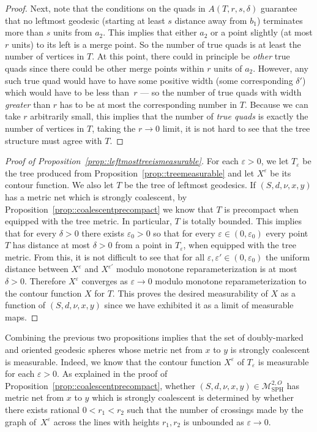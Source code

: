\documentclass[10pt]{amsart}
\let\mathcal\mathscr
\let\epsilon\varepsilon
\theoremstyle{plain}
\numberwithin{theorem}{section}
\theoremstyle{definition}
\newcommand\gmsspace{{\mathcal M}_{\mathrm{SPH}}}
\begin{document}
\begin{proof}
Next, note that the conditions on the quads in $A(T,r,s,\delta)$ guarantee that no leftmost geodesic (starting at least $s$ distance away from $b_1$) terminates more than $s$ units from $a_2$. This implies that either $a_2$ or a point slightly (at most $r$ units) to its left is a merge point. So the number of true quads is at least the number of vertices in $T$. At this point, there could in principle be \emph{other} true quads since there could be other merge points within $r$ units of $a_2$. However, any such true quad would have to have some positive width (some corresponding $\delta'$) which would have to be less than~$r$ --- so the number of true quads with width \emph{greater} than $r$ has to be at most the corresponding number in $T$. Because we can take $r$ arbitrarily small, this implies that the number of \emph{true quads} is exactly the number of vertices in $T$, taking the $r \to 0$ limit, it is not hard to see that the tree structure must agree with $T$.
\end{proof}

\begin{proof}[Proof of Proposition~\ref{prop::leftmosttreeismeasurable}]
For each $\epsilon > 0$, we let $T_\epsilon$ be the tree produced from Proposition~\ref{prop::treemeasurable} and let $X^\epsilon$ be its contour function. We also let $T$ be the tree of leftmost geodesics. If $(S,d,\nu,x,y)$ has a metric net which is strongly coalescent, by Proposition~\ref{prop::coalescentprecompact} we know that $T$ is precompact when equipped with the tree metric. In particular, $T$ is totally bounded. This implies that for every $\delta > 0$ there exists $\epsilon_0 > 0$ so that for every $\epsilon \in (0,\epsilon_0)$ every point $T$ has distance at most $\delta > 0$ from a point in $T_\epsilon$, when equipped with the tree metric. From this, it is not difficult to see that for all $\epsilon,\epsilon' \in (0,\epsilon_0)$ the uniform distance between $X^\epsilon$ and $X^{\epsilon'}$ modulo monotone reparameterization is at most $\delta > 0$. Therefore $X^\epsilon$ converges as $\epsilon \to 0$ modulo monotone reparameterization to the contour function $X$ for $T$. This proves the desired measurability of $X$ as a function of $(S,d,\nu,x,y)$ since we have exhibited it as a limit of measurable maps.
\end{proof}

Combining the previous two propositions implies that the set of doubly-marked and oriented geodesic spheres whose metric net from $x$ to $y$ is strongly coalescent is measurable. Indeed, we know that the contour function $X^\epsilon$ of $T_\epsilon$ is measurable for each $\epsilon > 0$. As explained in the proof of Proposition~\ref{prop::coalescentprecompact}, whether $(S,d,\nu,x,y) \in \gmsspace^{2,O}$ has metric net from $x$ to $y$ which is strongly coalescent is determined by whether there exists rational $0 < r_1 < r_2$ such that the number of crossings made by the graph of~$X^\epsilon$ across the lines with heights $r_1,r_2$ is unbounded as $\epsilon \to 0$.
\end{document}

